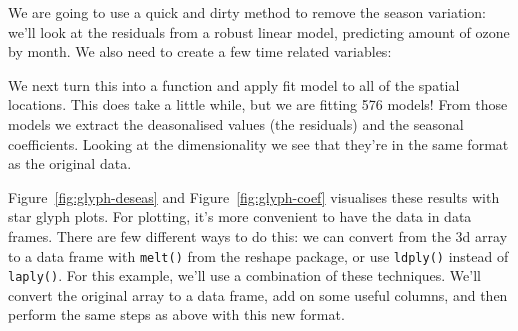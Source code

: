 \documentclass[letterpage]{scrartcl}
\newcommand{\f}[1]{\lstinline!#1()!}
\begin{document}
% 


We are going to use a quick and dirty method to remove the season variation: we'll look at the residuals from a robust linear model, predicting amount of ozone by month.  We also need to create a few time related variables:

% 
%


%


We next turn this into a function and apply fit model to all of the spatial locations.  This does take a little while, but we are fitting 576 models!  From those models we extract the deasonalised values (the residuals) and the seasonal coefficients.  Looking at the dimensionality we see that they're in the same format as the original data.

% 
% 
% 
% 

Figure~\ref{fig:glyph-deseas} and Figure~\ref{fig:glyph-coef} visualises these results with star glyph plots.  For plotting, it's more convenient to have the data in data frames.  There are few different ways to do this: we can convert from the 3d array to a data frame with \f{melt} from the reshape package, or use \f{ldply} instead of \f{laply}.  For this example, we'll use a combination of these techniques.  We'll convert the original array to a data frame, add on some useful columns, and then perform the same steps as above with this new format.

% 
\end{document}
